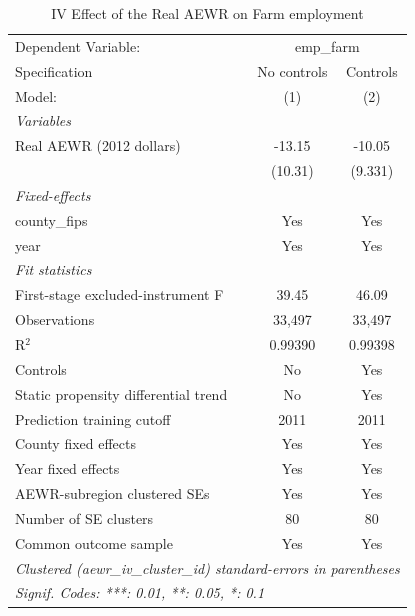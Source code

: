 
\begin{table}[htbp]
   \caption{\label{tab:iv_farm_employment} IV Effect of the Real AEWR on Farm employment}
   \centering
   \begin{tabular}{lcc}
      \tabularnewline \midrule \midrule
      Dependent Variable: & \multicolumn{2}{c}{emp\_farm}\\
      Specification                        & No controls & Controls \\
      Model:                               & (1)         & (2)\\
      \midrule
      \emph{Variables}\\
      Real AEWR (2012 dollars)             & -13.15      & -10.05\\
                                           & (10.31)     & (9.331)\\
      \midrule
      \emph{Fixed-effects}\\
      county\_fips                         & Yes         & Yes\\
      year                                 & Yes         & Yes\\
      \midrule
      \emph{Fit statistics}\\
      First-stage excluded-instrument F    & 39.45       & 46.09\\
      Observations                         & 33,497      & 33,497\\
      R$^2$                                & 0.99390     & 0.99398\\
      Controls                             & No          & Yes\\
      Static propensity differential trend & No          & Yes\\
      Prediction training cutoff           & 2011        & 2011\\
      County fixed effects                 & Yes         & Yes\\
      Year fixed effects                   & Yes         & Yes\\
      AEWR-subregion clustered SEs         & Yes         & Yes\\
      Number of SE clusters                & 80          & 80\\
      Common outcome sample                & Yes         & Yes\\
      \midrule \midrule
      \multicolumn{3}{l}{\emph{Clustered (aewr\_iv\_cluster\_id) standard-errors in parentheses}}\\
      \multicolumn{3}{l}{\emph{Signif. Codes: ***: 0.01, **: 0.05, *: 0.1}}\\
   \end{tabular}


\end{table}
